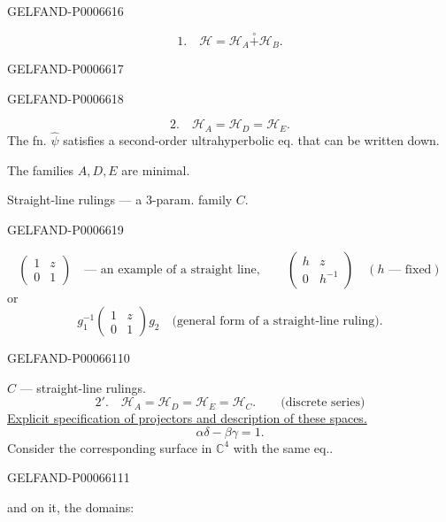 \begin{GelfandAdjacentEvidence}{GELFAND-P000661}{6}

\[
1.\quad \mathcal H=\mathcal H_A\overset{\circ}{+}\mathcal H_B.
\]
\end{GelfandAdjacentEvidence}
\begin{GelfandAdjacentEvidence}{GELFAND-P000661}{7}

\end{GelfandAdjacentEvidence}
\begin{GelfandAdjacentEvidence}{GELFAND-P000661}{8}

\[
2.\quad \mathcal H_A=\mathcal H_D=\mathcal H_E.
\]
The fn. \(\widehat\psi\) satisfies a second-order ultrahyperbolic eq. that can be written down.

The families \(A,D,E\) are minimal.

Straight-line rulings --- a 3-param. family \(C\).
\end{GelfandAdjacentEvidence}
\begin{GelfandAdjacentEvidence}{GELFAND-P000661}{9}

\[
\begin{pmatrix}1&z\\0&1\end{pmatrix}
\quad\text{--- an example of a straight line},\qquad
\begin{pmatrix}h&z\\0&h^{-1}\end{pmatrix}
\quad(h\text{ --- fixed})
\]
or
\[
g_1^{-1}\begin{pmatrix}1&z\\0&1\end{pmatrix}g_2
\quad\text{(general form of a straight-line ruling)}.
\]
\end{GelfandAdjacentEvidence}
\begin{GelfandAdjacentEvidence}{GELFAND-P000661}{10}


\(C\) --- straight-line rulings.
\[
2'.\quad \mathcal H_A=\mathcal H_D=\mathcal H_E=\mathcal H_C.
\qquad\text{(discrete series)}
\]
\underline{Explicit specification of projectors and description of these spaces.}
\[
\alpha\delta-\beta\gamma=1.
\]
Consider the corresponding surface in \(\mathbb C^4\) with the same eq..
\end{GelfandAdjacentEvidence}
\begin{GelfandAdjacentEvidence}{GELFAND-P000661}{11}


and on it, the domains:
\end{GelfandAdjacentEvidence}



